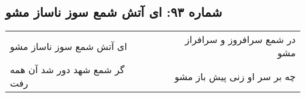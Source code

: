 \begin{center}
\section*{شماره ۹۳: ای آتش شمع سوز ناساز مشو}
\label{sec:093}
\begin{longtable}{l p{0.5cm} r}
ای آتش شمع سوز ناساز مشو
&&
در شمع سرافروز و سرافراز مشو
\\
گر شمع شهد دور شد آن همه رفت
&&
چه بر سر او زنی پیش باز مشو
\\
\end{longtable}
\end{center}
